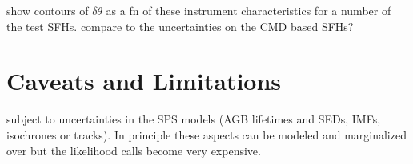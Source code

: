 \documentclass{emulateapj}
\begin{document}
show contours of $\delta \theta$ as a fn of these instrument characteristics for a number of the test SFHs.  compare to the uncertainties on the CMD based SFHs?

\section{Caveats and Limitations}
subject to uncertainties in the SPS models (AGB lifetimes and SEDs, IMFs, isochrones or tracks).  In principle these aspects can be modeled and marginalized over \citep{conroy09} but the likelihood calls become very expensive.
\end{document}
